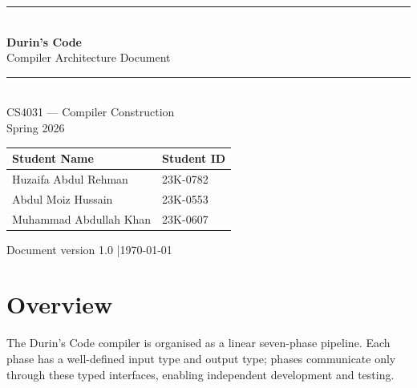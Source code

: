 \documentclass[12pt, a4paper]{article}
\begin{document}
\begin{titlepage}
  \centering
  \vspace*{2cm}
  {\color{durins-blue}\rule{\linewidth}{2pt}}\\[1em]
  {\Huge\bfseries\color{durins-blue} Durin's Code}\\[0.5em]
  {\LARGE\color{durins-gold} Compiler Architecture Document}\\[1em]
  {\color{durins-blue}\rule{\linewidth}{2pt}}\\[2em]

  {\large CS4031 --- Compiler Construction \\ Spring 2026}\\[3em]

  \begin{tabular}{ll}
    \toprule
    \textbf{Student Name} & \textbf{Student ID} \\
    \midrule
    Huzaifa Abdul Rehman   & 23K-0782 \\
    Abdul Moiz Hussain     & 23K-0553 \\
    Muhammad Abdullah Khan & 23K-0607 \\
    \bottomrule
  \end{tabular}

  \vfill
  {\small\color{durins-gray} Document version 1.0 \quad|\quad \today}
\end{titlepage}

\tableofcontents
\newpage

\section{Overview}

The Durin's Code compiler is organised as a linear seven-phase pipeline.
Each phase has a well-defined input type and output type; phases communicate only
through these typed interfaces, enabling independent development and testing.
\end{document}
